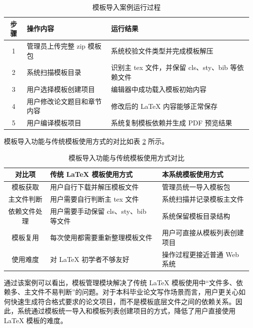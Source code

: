 \documentclass{xduugthesis}
\begin{document}
\begin{table}[!ht]
    \centering
    \caption{模板导入案例运行过程}
    \label{tab:template-import-case}
    \begin{tabular}{|c|p{5cm}|p{6cm}|}
        \hline
        步骤 & 操作内容 & 运行结果 \\
        \hline
        1 & 管理员上传完整 zip 模板包 & 系统校验文件类型并完成模板解压 \\
        \hline
        2 & 系统扫描模板目录 & 识别主 tex 文件，并保留 cls、sty、bib 等依赖文件 \\
        \hline
        3 & 用户选择模板创建项目 & 编辑器中成功载入模板初始内容 \\
        \hline
        4 & 用户修改论文题目和章节内容 & 修改后的 LaTeX 内容能够正常保存 \\
        \hline
        5 & 用户编译模板项目 & 系统复制模板依赖并生成 PDF 预览结果 \\
        \hline
    \end{tabular}
\end{table}

模板导入功能与传统模板使用方式的对比如表 \ref{tab:template-compare} 所示。

\begin{table}[!ht]
    \centering
    \caption{模板导入功能与传统模板使用方式对比}
    \label{tab:template-compare}
    \begin{tabular}{|c|p{5cm}|p{5cm}|}
        \hline
        对比项 & 传统 LaTeX 模板使用方式 & 本系统模板使用方式 \\
        \hline
        模板获取 & 用户自行下载并解压模板文件 & 管理员统一导入模板包 \\
        \hline
        主文件判断 & 用户需要自行判断主 tex 文件 & 系统扫描并记录模板主文件 \\
        \hline
        依赖文件处理 & 用户需要手动保留 cls、sty、bib 等文件 & 系统保留模板目录结构 \\
        \hline
        模板复用 & 每次使用都需要重新整理模板文件 & 用户可直接从模板列表创建项目 \\
        \hline
        使用难度 & 对 LaTeX 初学者不够友好 & 操作过程更接近普通 Web 系统 \\
        \hline
    \end{tabular}
\end{table}

通过该案例可以看出，模板管理模块解决了传统 LaTeX 模板使用中“文件多、依赖多、主文件不易判断”的问题。对于本科毕业论文写作场景而言，用户更关心如何快速生成符合格式要求的论文项目，而不是模板底层文件之间的依赖关系。因此，系统通过模板统一导入和模板列表创建项目的方式，降低了用户直接使用 LaTeX 模板的难度。
\end{document}
